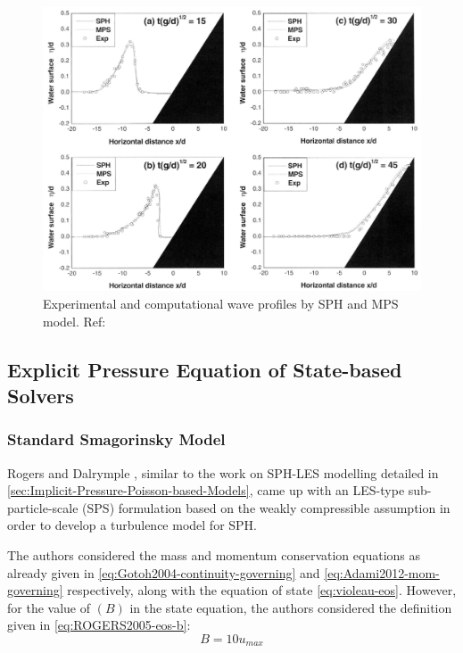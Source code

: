 \begin{figure}[h!]
	\centering
	\includegraphics[scale=0.6]{Figures/research_papers/shao2005-wave-profile-result.png}
	\caption{Experimental and computational wave profiles by SPH and MPS model. Ref: \parencite{Shao2005}}
	\label{fig:shao2005-wave-profile-result}
\end{figure}


\subsection{Explicit Pressure Equation of State-based Solvers}
\subsubsection{Standard Smagorinsky Model}

Rogers and Dalrymple \parencite{ROGERS2005}, similar to the work on SPH-LES modelling detailed in \ref{sec:Implicit-Pressure-Poisson-based-Models}, came up with an LES-type sub-particle-scale (SPS) formulation based on the weakly compressible assumption in order to develop a turbulence model for SPH.

The authors considered the mass and momentum conservation equations as already given in \ref{eq:Gotoh2004-continuity-governing} and  \ref{eq:Adami2012-mom-governing} respectively, along with the equation of state \ref{eq:violeau-eos}. However, for the value of $(B)$ in the state equation, the authors considered the definition given in \ref{eq:ROGERS2005-eos-b}:
\begin{equation}
	B = 10 u_{max}
	\label{eq:ROGERS2005-eos-b}
\end{equation}


